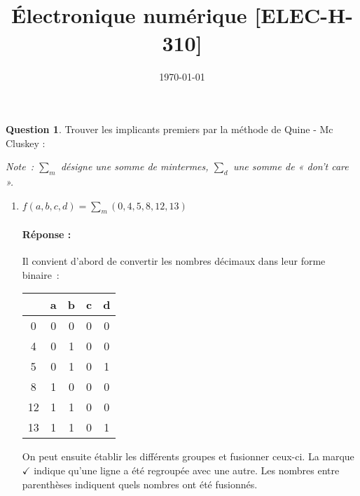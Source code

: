 \documentclass[11pt,a4paper,dvipsnames]{article}
\date{\vspace{-1.7cm}\mydate\today}
\title{\vspace{-2cm} \tpnumber \\ Électronique numérique [ELEC-H-310] \ifthenelse{\boolean{corrige}}{~\\Corrigé}{}}
\theoremstyle{definition}%
\newtheorem{Q}{Question}[] %
\newcommand{\reponse}[1]{%
	\ifthenelse {\boolean{corrige}} {\paragraph{Réponse :} \color{darkblue}   #1\color{black}~\\} {}
 }
\begin{document}
\pagestyle{empty}
\maketitle
\vspace*{-1cm}

\begin{Q}
Trouver les implicants premiers par la méthode de Quine - Mc Cluskey :

\textit{Note~: $\sum_m$ désigne une somme de mintermes, $\sum_d$ une somme de « don't care ».}

\begin{enumerate}
	\item $f(a,b,c,d)=\sum_m(0,4,5,8,12,13)$
	\reponse{
		Il convient d'abord de convertir les nombres décimaux dans leur forme binaire~:
		\begin{center}
			\begin{tabular}{c|cccc}
			 & a & b & c & d \\ \hline
			 0 & 0 & 0 & 0 & 0 \\
			 4 & 0 & 1 & 0 & 0 \\
			 5 & 0 & 1 & 0 & 1 \\
			 8 & 1 & 0 & 0 & 0 \\
			 12 & 1 & 1 & 0 & 0 \\
			 13 & 1 & 1 & 0 & 1 \\
			\end{tabular}
		\end{center}

		On peut ensuite établir les différents groupes et fusionner ceux-ci.
		La marque $\checkmark$ indique qu'une ligne a été regroupée avec une autre.
		Les nombres entre parenthèses indiquent quels nombres ont été fusionnés.

}
\end{enumerate}
\end{Q}
\end{document}
